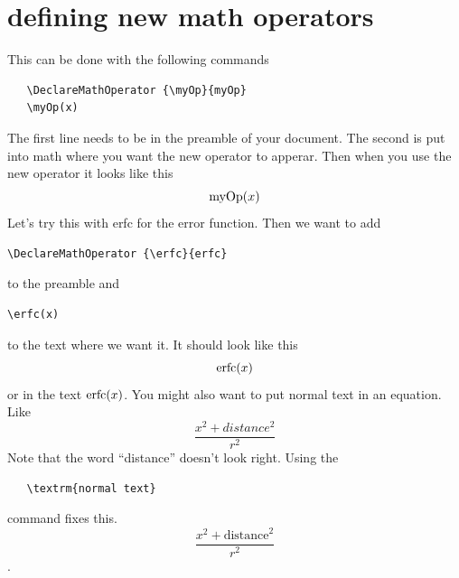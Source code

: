 \section{defining new math operators}
This can be done with the following commands
\begin {verbatim}
   \DeclareMathOperator {\myOp}{myOp}
   \myOp(x)
\end{verbatim}
The first line needs to be in the preamble of your document. The second is put into math where you want the new operator to apperar. Then when you use the new operator it looks like this
$$\myOp(x)$$
Let's try this with erfc for the error function. Then we want to add 
\begin {verbatim}
\DeclareMathOperator {\erfc}{erfc}
\end{verbatim}
to the preamble and 
\begin {verbatim}
\erfc(x)
\end{verbatim} 
to the text where we want it.  It should look like this
$$\erfc(x)$$
or in the text $\erfc(x)$.
You might also want to put normal text in an equation. Like 
$$ \frac{x^2+distance^2}{r^2}$$
Note that the word ``distance'' doesn't look right. Using the 
\begin {verbatim}
   \textrm{normal text}
\end{verbatim}
command fixes this.
$$ \frac{x^2+\textrm{distance}^2}{r^2}$$.

